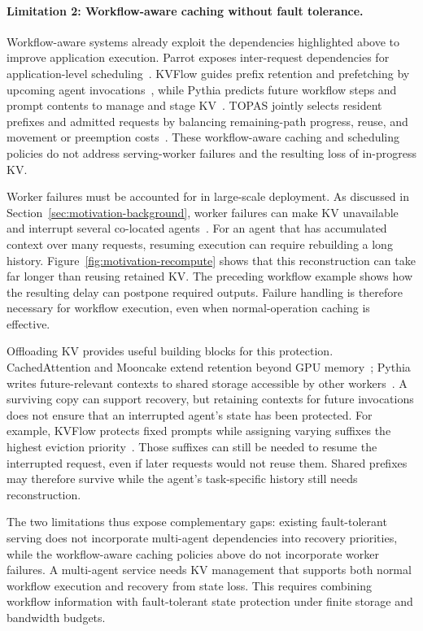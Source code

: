 \paragraph{Limitation 2: Workflow-aware caching without fault tolerance.}
Workflow-aware systems already exploit the dependencies highlighted
above to improve application execution. Parrot exposes inter-request
dependencies for application-level
scheduling~\cite{lin2024parrot}. KVFlow guides prefix retention and
prefetching by upcoming agent invocations~\cite{pan2025kvflow}, while Pythia
predicts future workflow steps and prompt contents to manage and stage
KV~\cite{yu2026pythia}. TOPAS jointly selects resident prefixes and admitted
requests by balancing remaining-path progress, reuse, and movement or
preemption costs~\cite{ni2026topas}. These workflow-aware caching and
scheduling policies do not address serving-worker failures and the
resulting loss of in-progress KV.

Worker failures must be accounted for in large-scale deployment.
As discussed in Section~\ref{sec:motivation-background}, worker failures
can make KV unavailable and interrupt several co-located
agents~\cite{strati2024dejavu,jayakody2026ghostserve,cao2026lumen}.
For an agent that has accumulated context over many requests, resuming
execution can require rebuilding a long history.
Figure~\ref{fig:motivation-recompute} shows that this reconstruction can
take far longer than reusing retained KV. The preceding workflow example
shows how the resulting delay can postpone required outputs.
Failure handling is therefore necessary for workflow execution,
even when normal-operation caching is effective.

Offloading KV provides useful building blocks for this protection.
CachedAttention and Mooncake extend retention beyond GPU
memory~\cite{gao2024cachedattention,qin2025mooncake}; Pythia writes
future-relevant contexts to shared storage accessible by other
workers~\cite{yu2026pythia}. A surviving copy can support recovery, but
retaining contexts for future invocations does not ensure that an
interrupted agent's state has been protected. For example, KVFlow
protects fixed prompts while assigning varying suffixes the highest
eviction priority~\cite{pan2025kvflow}. Those suffixes can still be needed
to resume the interrupted request, even if later requests would not
reuse them. Shared prefixes may therefore survive while the agent's
task-specific history still needs reconstruction.

\label{sec:motivation-long-context}
The two limitations thus expose complementary gaps: existing
fault-tolerant serving does not incorporate multi-agent dependencies
into recovery priorities, while the workflow-aware caching policies
above do not incorporate worker failures.
A multi-agent service needs KV management that supports both normal
workflow execution and recovery from state loss. This requires
combining workflow information with fault-tolerant state protection
under finite storage and bandwidth budgets.

